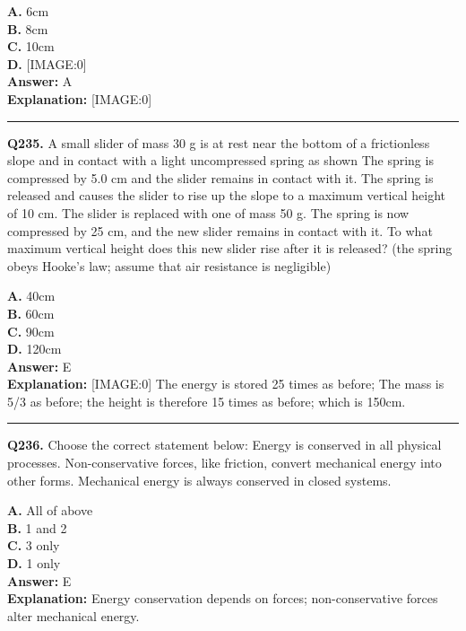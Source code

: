 \documentclass[12pt]{article}
\begin{document}
\textbf{A.} 6cm \\
\textbf{B.} 8cm \\
\textbf{C.} 10cm \\
\textbf{D.} [IMAGE:0] \\

\textbf{Answer:} A \\
\textbf{Explanation:} [IMAGE:0]

\hrule
\vspace{1em}


\noindent
\textbf{Q235.} A small slider of mass 30 g is at rest near the bottom of a frictionless slope and in contact with a light uncompressed spring as shown
The spring is compressed by 5.0 cm and the slider remains in contact with it.
The spring is released and causes the slider to rise up the slope to a maximum vertical height of 10 cm.
The slider is replaced with one of mass 50 g.
The spring is now compressed by 25 cm, and the new slider remains in contact with it. To what maximum vertical height does this new slider rise after it is released?
(the spring obeys Hooke’s law; assume that air resistance is negligible)



\textbf{A.} 40cm \\
\textbf{B.} 60cm \\
\textbf{C.} 90cm \\
\textbf{D.} 120cm \\

\textbf{Answer:} E \\
\textbf{Explanation:} [IMAGE:0]
The energy is stored 25 times as before; The mass is 5/3 as before; the height is therefore 15 times as before; which is 150cm.

\hrule
\vspace{1em}


\noindent
\textbf{Q236.} Choose the correct statement below:
Energy is conserved in all physical processes.
Non-conservative forces, like friction, convert mechanical energy into other forms.
Mechanical energy is always conserved in closed systems.



\textbf{A.} All of above \\
\textbf{B.} 1 and 2 \\
\textbf{C.} 3 only \\
\textbf{D.} 1 only \\

\textbf{Answer:} E \\
\textbf{Explanation:} Energy conservation depends on forces; non-conservative forces alter mechanical energy.
\end{document}
